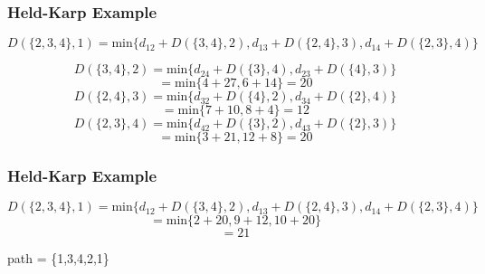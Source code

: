 \documentclass{beamer}
\begin{document}
\begin{frame}
\frametitle{Held-Karp Example}

$$D(\{2,3,4\},1)=\text{min}\{d_{12} + D(\{3,4\},2), d_{13} + D(\{2,4\},3), d_{14} + D(\{2,3\},4)\}$$

$$D(\{3,4\},2) = \text{min}\{d_{24} + D(\{3\},4), d_{23} + D(\{4\},3)\} $$
$$= \text{min}\{4 + 27 , 6 + 14\} = 20$$
$$ D(\{2,4\},3) = \text{min}\{d_{32} + D(\{4\},2),  d_{34} + D(\{2\},4)\}$$
$$= \text{min}\{7 + 10, 8 + 4\}  = 12$$
$$ D(\{2,3\},4) =  \text{min}\{d_{42} + D(\{3\},2),    d_{43} + D(\{2\},3)\} $$
$$=\text{min}\{3 + 21, 12 + 8\}  = 20$$


\end{frame}
\begin{frame}
\frametitle{Held-Karp Example}

$$D(\{2,3,4\},1)=\text{min}\{d_{12} + D(\{3,4\},2), d_{13} + D(\{2,4\},3), d_{14} + D(\{2,3\},4)\}$$
$$ = \text{min}\{2+ 20, 9+ 12, 10+ 20\} $$
$$ = 21$$

path = \{1,3,4,2,1\}


\end{frame}
\end{document}
